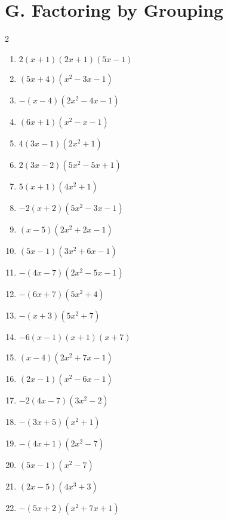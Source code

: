 \documentclass[11pt,oneside]{book}
\begin{document}
\section*{G. Factoring by Grouping}
\begin{multicols}{2}
\begin{enumerate}[leftmargin=*,label=\textbf{G\arabic*.},itemsep=0.45\baselineskip]
\item $ 2 \left(x + 1\right) \left(2 x + 1\right) \left(5 x - 1\right) $
\item $ \left(5 x + 4\right) \left(x^{2} - 3 x - 1\right) $
\item $ - \left(x - 4\right) \left(2 x^{2} - 4 x - 1\right) $
\item $ \left(6 x + 1\right) \left(x^{2} - x - 1\right) $
\item $ 4 \left(3 x - 1\right) \left(2 x^{2} + 1\right) $
\item $ 2 \left(3 x - 2\right) \left(5 x^{2} - 5 x + 1\right) $
\item $ 5 \left(x + 1\right) \left(4 x^{2} + 1\right) $
\item $ - 2 \left(x + 2\right) \left(5 x^{2} - 3 x - 1\right) $
\item $ \left(x - 5\right) \left(2 x^{2} + 2 x - 1\right) $
\item $ \left(5 x - 1\right) \left(3 x^{2} + 6 x - 1\right) $
\item $ - \left(4 x - 7\right) \left(2 x^{2} - 5 x - 1\right) $
\item $ - \left(6 x + 7\right) \left(5 x^{2} + 4\right) $
\item $ - \left(x + 3\right) \left(5 x^{2} + 7\right) $
\item $ - 6 \left(x - 1\right) \left(x + 1\right) \left(x + 7\right) $
\item $ \left(x - 4\right) \left(2 x^{2} + 7 x - 1\right) $
\item $ \left(2 x - 1\right) \left(x^{2} - 6 x - 1\right) $
\item $ - 2 \left(4 x - 7\right) \left(3 x^{2} - 2\right) $
\item $ - \left(3 x + 5\right) \left(x^{2} + 1\right) $
\item $ - \left(4 x + 1\right) \left(2 x^{2} - 7\right) $
\item $ \left(5 x - 1\right) \left(x^{2} - 7\right) $
\item $ \left(2 x - 5\right) \left(4 x^{3} + 3\right) $
\item $ - \left(5 x + 2\right) \left(x^{2} + 7 x + 1\right) $

\end{enumerate}
\end{multicols}
\end{document}
